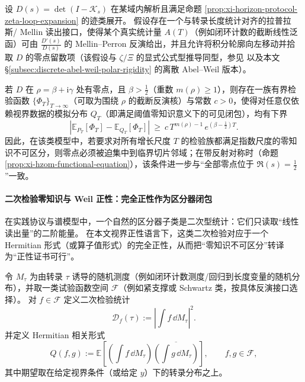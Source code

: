\begin{proposition}\label{prop:xi-hzom-offcritical-zero-distinguisher}
设 \(D(s)=\det(I-\mathcal{K}_s)\) 在某域内解析且满足命题 \ref{prop:xi-horizon-protocol-zeta-loop-expansion} 的迹类展开。
假设存在一个与转录长度统计对齐的拉普拉斯/ Mellin 读出接口，使得某个真实统计量 \(A(T)\)（例如闭环计数的截断线性泛函）可由 \(\frac{D'(s)}{D(s)}\) 的 Mellin--Perron 反演给出，并且允许将积分轮廓向左移动并拾取 \(D\) 的零点留数项（该假设与 \(\zeta/\Xi\) 的显式公式型推导同型，参见 \cite{Connes1999TraceFormulaNCG} 以及本文 \S\ref{subsec:discrete-abel-weil-polar-rigidity} 的离散 Abel--Weil 版本）。
\par
若 \(D\) 在 \(\rho=\beta+\mathrm{i}\gamma\) 处有零点，且 \(\beta>\tfrac12\)（重数 \(m(\rho)\ge 1\)），则存在一族有界检验函数 \(\{\Phi_T\}_{T\to\infty}\)（可取为围绕 \(\rho\) 的截断反演核）与常数 \(c>0\)，使得对任意仅依赖视界数据的模拟分布 \(Q_T\)（即满足阈值零知识意义下的可见闭包），均有下界
\[
\left|\mathbb{E}_{P_T}[\Phi_T]-\mathbb{E}_{Q_T}[\Phi_T]\right|
\ \ge\
c\,T^{m(\rho)-1}\,e^{(\beta-\frac12)T}.
\]
因此，在该类模型中，若要求对所有增长尺度 \(T\) 的检验族都满足指数尺度的零知识不可区分，则零点必须被迫集中到临界切片邻域；在带反射对称时（命题 \ref{prop:xi-hzom-functional-equation}），该条件进一步与“全部零点位于 \(\Re(s)=\tfrac12\)”一致。
\end{proposition}

\paragraph{二次检验零知识与 Weil 正性：完全正性作为区分器闭包}
在实践协议与谱模型中，一个自然的区分器子类是二次型统计：它们只读取“线性读出量”的二阶能量。
在本文视界正性语言下，这类二次检验对应于一个 Hermitian 形式（或算子值形式）的完全正性，从而把“零知识不可区分”转译为“正性证书可行”。

\begin{definition}[二次检验区分器与相关形式]\label{def:xi-hzom-quadratic-distinguishers}
令 \(M_{\tau}\) 为由转录 \(\tau\) 诱导的随机测度（例如闭环计数测度/回归到长度变量的随机分布），并取一类试验函数空间 \(\mathcal{F}\)（例如紧支撑或 Schwartz 类，按具体反演接口选择）。
对 \(f\in\mathcal{F}\) 定义二次检验统计
\[
\mathcal{D}_{f}(\tau):=\left|\int f\,\dd M_{\tau}\right|^{2}.
\]
并定义 Hermitian 相关形式
\[
Q(f,g):=\mathbb{E}\!\left[\left(\int f\,\dd M_{\tau}\right)\overline{\left(\int g\,\dd M_{\tau}\right)}\right],
\qquad f,g\in\mathcal{F},
\]
其中期望取在给定视界条件（或给定 \(y\)）下的转录分布之上。
\end{definition}

